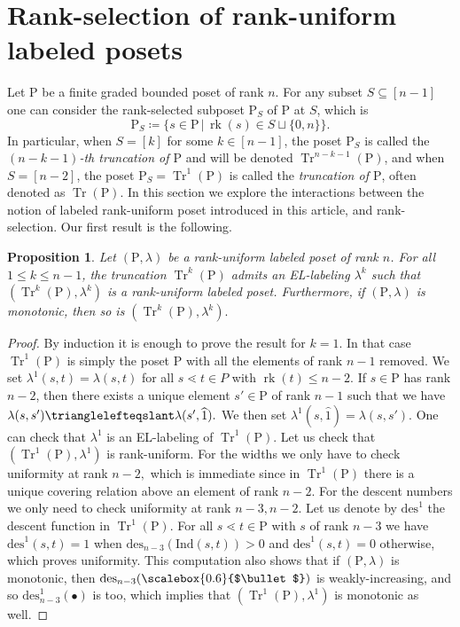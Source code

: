 \documentclass[11pt,a4paper]{amsart}
\theoremstyle{results}
\newtheorem{proposition}[thm]{Proposition}
\theoremstyle{definitions}
\def\P{\mathbb{P}}
\newcommand{\Tr}{\operatorname{Tr}}
\newcommand{\rk}{\operatorname{rk}}
\newcommand{\des}{\mathrm{des}}
\newcommand{\un}{\hat{1}}
\newcommand{\medbullet}{\mathbin{\vcenter{\hbox{\scalebox{0.6}{$\bullet$}}}}}
\newcommand{\Ind}{\mathrm{Ind}}
\renewcommand{\P}{\mathrm{P}}
\renewcommand{\hat}{\widehat}
\begin{document}
\section{Rank-selection of rank-uniform labeled posets}\label{sec:rank-selection}
Let $\P$ be a finite graded bounded poset of rank $n$. For any subset $S \subseteq [n-1]$ one can consider the rank-selected subposet $\P_S$ of $\P$ at $S$, which is
\begin{equation*}
    \P_S \coloneqq \{ s \in \P \, |\, \rk(s) \in S\sqcup \{0, n \}\}.
\end{equation*}
In particular, when $S = [k]$ for some $k \in [n-1]$, the poset $\P_{S}$ is called the \emph{$(n-k-1)$-th truncation of $\P$} and will be denoted $\Tr^{n-k-1}(\P)$, and when $S = [n-2]$, the poset $\P_S = \Tr^{1}(\P)$ is called the \emph{truncation of $\P$}, often denoted as $\Tr(\P)$. In this section we explore the interactions between the notion of labeled rank-uniform poset introduced in this article, and rank-selection. Our first result is the following.
\begin{proposition}\label{prop:truncation}
Let $(\P, \lambda)$ be a rank-uniform labeled poset of rank $n$. For all $1 \leqslant k \leqslant n-1$, the truncation $\Tr^k(\P)$ admits an EL-labeling $\lambda^k$ such that $(\Tr^k(\P), \lambda^k)$ is a rank-uniform labeled poset. Furthermore, if $(\P, \lambda)$ is monotonic, then so is $(\Tr^k(\P), \lambda^k).$
\end{proposition}
\begin{proof}
By induction it is enough to prove the result for $k = 1$. In that case $\Tr^1(\P)$ is simply the poset $\P$ with all the elements of rank $n-1$ removed. We set $\lambda^1(s,t) = \lambda(s,t)$ for all $s\lessdot t \in P$ with $\rk(t) \leqslant n-2.$ If $s\in \P$ has rank $n-2$, then there exists a unique element $s'\in \P$ of rank $n-1$ such that we have $\lambda(s,s') \trianglelefteqslant \lambda(s', \un).$ We then set $\lambda^1(s, \un) = \lambda(s,s').$ One can check that $\lambda^1$ is an EL-labeling of $\Tr^1(\P)$. Let us check that $(\Tr^1(\P), \lambda^1)$ is rank-uniform. For the widths we only have to check uniformity at rank $n-2,$ which is immediate since in $\Tr^1(\P)$ there is a unique covering relation above an element of rank $n-2$. For the descent numbers we only need to check uniformity at rank $n-3,n-2.$ Let us denote by $\des^1$ the descent function in $\Tr^1(\P).$ For all $s\lessdot t \in \P$ with $s$ of rank $n-3$ we have $\des^1(s,t) = 1$ when $\des_{n-3}(\Ind(s,t)) > 0$ and $\des^1(s,t) = 0$ otherwise, which proves uniformity. This computation also shows that if $(\P, \lambda)$ is monotonic, then $\des_{n-3}(\medbullet)$ is weakly-increasing, and so $\des^1_{n-3}(\bullet)$ is too, which implies that $(\Tr^1(\P), \lambda^1)$ is monotonic as well. 
\end{proof}
\end{document}

